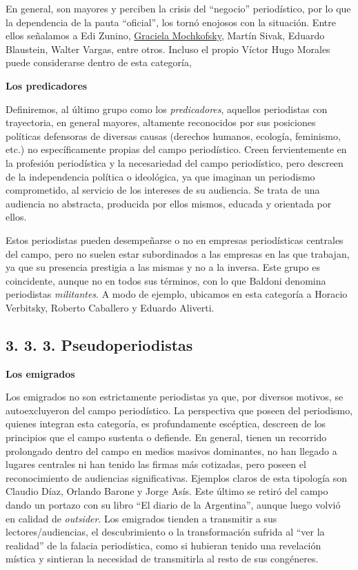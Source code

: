 {En general, son mayores y perciben la crisis del \enquote{negocio} periodístico, por lo que la dependencia de la pauta \enquote{oficial}, los tornó enojosos con la situación. Entre ellos señalamos a Edi Zunino, \href{http://www.tematika.com/buscar.do?seccionDeBusqueda=En+Libros\&seccion=1\&claveDeBusqueda=porAutor\&txtencoded=Graciela+Mochkofsky\&idAutor=35432\&criterioDeOrden=2\&idSeccion=1\&texto=Graciela+Mochkofsky\&optSeleccionada=Autor\&idSeccionPropia=1}{Graciela Mochkofsky}, Martín Sivak, Eduardo Blaustein, Walter Vargas, entre otros. Incluso el propio Víctor Hugo Morales puede considerarse dentro de esta categoría,

\textbf{Los predicadores}

Definiremos, al último grupo como los \emph{predicadores}, aquellos periodistas con trayectoria, en general mayores, altamente reconocidos por sus posiciones políticas defensoras de diversas causas (derechos humanos, ecología, feminismo, etc.) no específicamente propias del campo periodístico. Creen fervientemente en la profesión periodística y la necesariedad del campo periodístico, pero descreen de la independencia política o ideológica, ya que imaginan un periodismo comprometido, al servicio de los intereses de su audiencia. Se trata de una audiencia no abstracta, producida por ellos mismos, educada y orientada por ellos.

Estos periodistas pueden desempeñarse o no en empresas periodísticas centrales del campo, pero no suelen estar subordinados a las empresas en las que trabajan, ya que su presencia prestigia a las mismas y no a la inversa. Este grupo es coincidente, aunque no en todos sus términos, con lo que Baldoni denomina periodistas \emph{militantes}. A modo de ejemplo, ubicamos en esta categoría a Horacio Verbitsky, Roberto Caballero y Eduardo Aliverti.


\subsection{3. 3. 3. Pseudoperiodistas}

\textbf{Los emigrados}

Los emigrados no son estrictamente periodistas ya que, por diversos motivos, se autoexcluyeron del campo periodístico. La perspectiva que poseen del periodismo, quienes integran esta categoría, es profundamente escéptica, descreen de los principios que el campo sustenta o defiende. En general, tienen un recorrido prolongado dentro del campo en medios masivos dominantes, no han llegado a lugares centrales ni han tenido las firmas más cotizadas, pero poseen el reconocimiento de audiencias significativas. Ejemplos claros de esta tipología son Claudio Díaz, Orlando Barone y Jorge Asís. Este último se retiró del campo dando un portazo con su libro \enquote{El diario de la Argentina}, aunque luego volvió en calidad de \emph{outsider}. Los emigrados tienden a transmitir a sus lectores/audiencias, el descubrimiento o la transformación sufrida al \enquote{ver la realidad} de la falacia periodística, como si hubieran tenido una revelación mística y sintieran la necesidad de transmitirla al resto de sus congéneres.

}
